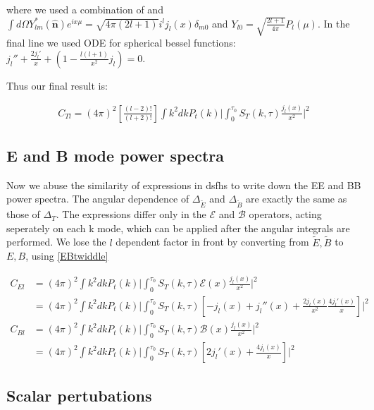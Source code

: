 \documentclass[a4paper,11pt]{article}
\renewcommand{\v}[1]{\mathbf{#1}}
\newcommand{\unit}[1]{\hat{\v{#1}}}
\newcommand{\ltwof}{[\frac{(l-2)!}{(l+2)!}]}
\begin{document}
where we used a combination of and $\int d\Omega Y_{lm}^*(\unit{n})e^{ix\mu} = \sqrt{4\pi(2l+1)}i^l j_l(x) \delta_{m0}$ and $Y_{l0} = \sqrt{\frac{2l+1}{4\pi}}P_l(\mu)$. In the final line we used ODE for spherical bessel functions: $j_l''+\frac{2j_l'}{x}+(1-\frac{l(l+1)}{x^2}j_l)=0$.

Thus our final result is:

\begin{align}
C_{Tl} = (4\pi)^2\ltwof \int k^2 dk P_t(k) \bigg|  \int_0^{\tau_0} S_T(k,\tau)\frac{j_l(x)}{x^2} \bigg|^2
\end{align}

\subsection{E and B mode power spectra}

Now we abuse the similarity of expressions in dsfhs to write down the EE and BB power spectra. The angular dependence of $\Delta_{\tilde{E}}$ and $\Delta_{\tilde{B}}$ are exactly the same as those of $\Delta_T$. The expressions differ only in the $\mathcal{E}$ and $\mathcal{B}$ operators, acting seperately on each k mode, which can be applied after the angular integrals are performed. We lose the $l$ dependent factor in front by converting from $\tilde{E}, \tilde{B}$ to $E,B$, using \ref{EBtwiddle}


\begin{align}
C_{El} &= (4\pi)^2 \int k^2 dk P_t(k) \bigg|  \int_0^{\tau_0} S_T(k,\tau)\mathcal{E}(x)\frac{j_l(x)}{x^2} \bigg|^2\\
&= (4\pi)^2\int k^2 dk P_t(k) \bigg|  \int_0^{\tau_0} S_T(k,\tau)[-j_l(x) +j_l''(x)+\frac{2j_l(x)}{x^2} \frac{4j_l'(x)}{x}]\bigg|^2\\
C_{Bl} &= (4\pi)^2 \int k^2 dk P_t(k) \bigg|  \int_0^{\tau_0} S_T(k,\tau)\mathcal{B}(x)\frac{j_l(x)}{x^2} \bigg|^2\\
&= (4\pi)^2\int k^2 dk P_t(k) \bigg|  \int_0^{\tau_0} S_T(k,\tau)[2j_l'(x)+\frac{4j_l(x)}{x}]\bigg|^2
\end{align}


\subsection{Scalar pertubations}
\end{document}
